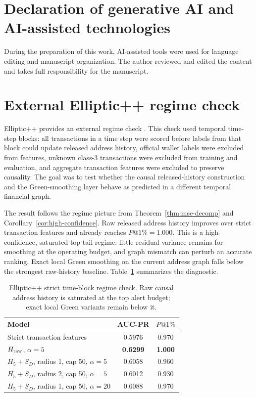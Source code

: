 \documentclass[11pt]{article}
\theoremstyle{definition}
\theoremstyle{remark}
\begin{document}
\section*{Declaration of generative AI and AI-assisted technologies}
During the preparation of this work, AI-assisted tools were used for language editing and manuscript organization. The author reviewed and edited the content and takes full responsibility for the manuscript.

\appendix
\section{External Elliptic++ regime check}
\label{app:ellipticpp}

Elliptic++ provides an external regime check \cite{elmougy2023}. This check used temporal time-step blocks: all transactions in a time step were scored before labels from that block could update released address history, official wallet labels were excluded from features, unknown class-3 transactions were excluded from training and evaluation, and aggregate transaction features were excluded to preserve causality. The goal was to test whether the causal released-history construction and the Green-smoothing layer behave as predicted in a different temporal financial graph.

The result follows the regime picture from Theorem~\ref{thm:mse-decomp} and Corollary~\ref{cor:high-confidence}. Raw released address history improves over strict transaction features and already reaches $P@1\%=1.000$. This is a high-confidence, saturated top-tail regime: little residual variance remains for smoothing at the operating budget, and graph mismatch can perturb an accurate ranking. Exact local Green smoothing on the current address graph falls below the strongest raw-history baseline. Table~\ref{tab:ellipticpp-smoke} summarizes the diagnostic.

\begin{table}[h]
\centering
\caption{Elliptic++ strict time-block regime check. Raw causal address history is saturated at the top alert budget; exact local Green variants remain below it.}
\label{tab:ellipticpp-smoke}
\begin{tabular}{lcc}
\toprule
Model & AUC-PR & $P@1\%$ \\
\midrule
Strict transaction features & 0.5976 & 0.970 \\
$H_{\rm raw}$, $\alpha=5$ & \textbf{0.6299} & \textbf{1.000} \\
$H_5+S_D$, radius 1, cap 50, $\alpha=5$ & 0.6058 & 0.960 \\
$H_5+S_D$, radius 2, cap 50, $\alpha=5$ & 0.6012 & 0.930 \\
$H_5+S_D$, radius 1, cap 50, $\alpha=20$ & 0.6088 & 0.970 \\
\bottomrule
\end{tabular}
\end{table}
\end{document}

